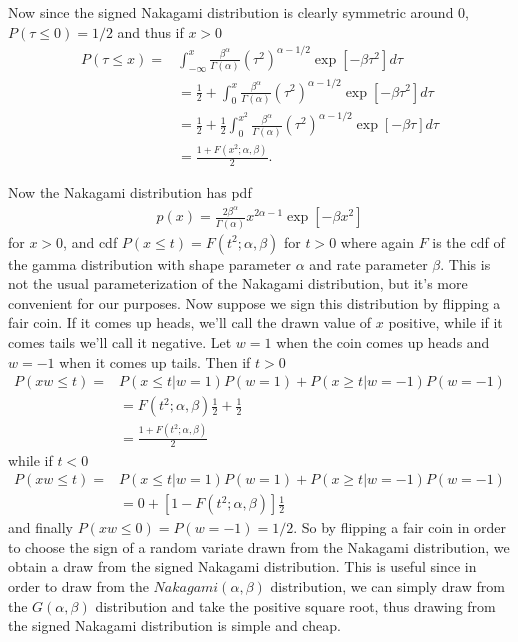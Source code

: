 \documentclass{article}
\begin{document}
Now since the signed Nakagami distribution is clearly symmetric around 0, $P(\tau\leq 0)=1/2$ and thus if $x>0$
\begin{align*}
  P(\tau \leq x) = &\int_{-\infty}^x \frac{\beta^\alpha}{\Gamma(\alpha) }(\tau^2)^{\alpha-1/2}\exp\left[-\beta\tau^2\right] d\tau \\
  &= \frac{1}{2} + \int_{0}^x \frac{\beta^\alpha}{\Gamma(\alpha) }(\tau^2)^{\alpha-1/2}\exp\left[-\beta\tau^2\right] d\tau \\
    &=\frac{1}{2} + \frac{1}{2}\int_0^{x^2} \frac{\beta^\alpha}{\Gamma(\alpha) }(\tau^2)^{\alpha-1/2}\exp\left[-\beta \tau\right] d\tau\\
    &= \frac{1 + F(x^2;\alpha,\beta)}{2}.
\end{align*}

Now the Nakagami distribution has pdf
\begin{align*}
  p(x) = \frac{2 \beta^\alpha}{ \Gamma(\alpha)}x^{2\alpha -1}\exp\left[-\beta x^2\right]
\end{align*}
for $x>0$, and cdf $P(x\leq t)=F(t^2;\alpha,\beta)$ for $t>0$ where again $F$ is the cdf of the gamma distribution with shape parameter $\alpha$ and rate parameter $\beta$. This is not the usual parameterization of the Nakagami distribution, but it's more convenient for our purposes. Now suppose we sign this distribution by flipping a fair coin. If it comes up heads, we'll call the drawn value of $x$ positive, while if it comes tails we'll call it negative. Let $w=1$ when the coin comes up heads and $w=-1$ when it comes up tails. Then if $t> 0$
\begin{align*}
  P(xw \leq t) =& P(x\leq t | w=1)P(w=1) + P(x\geq t|w=-1)P(w=-1) \\
  &= F(t^2;\alpha,\beta)\frac{1}{2} + \frac{1}{2}\\
  &=\frac{1+ F(t^2;\alpha,\beta)}{2}
\end{align*}
while if $t<0$
\begin{align*}
  P(xw \leq t) =& P(x\leq t | w=1)P(w=1) + P(x\geq t|w=-1)P(w=-1) \\
  &= 0 + [1-F(t^2;\alpha,\beta)]\frac{1}{2}
\end{align*}
and finally $P(xw\leq 0) = P(w=-1) = 1/2$. So by flipping a fair coin in order to choose the sign of a random variate drawn from the Nakagami distribution, we obtain a draw from the signed Nakagami distribution. This is useful since in order to draw from the $Nakagami(\alpha,\beta)$ distribution, we can simply draw from the $G(\alpha,\beta)$ distribution and take the positive square root, thus drawing from the signed Nakagami distribution is simple and cheap.
\end{document}
